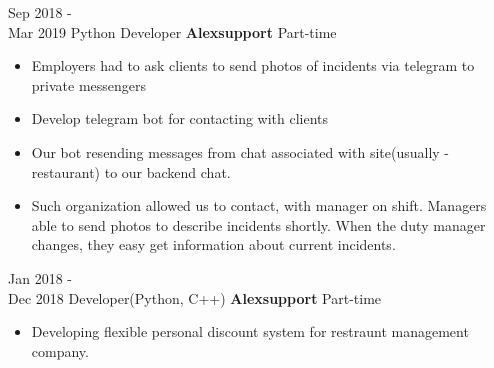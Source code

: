 \documentclass[a4paper]{twentysecondcv} %
\begin{document}
\begin{twenty}
{\begin{itemize}
            \end{itemize}
        }
    \twentyitem
        {Sep 2018 - \\ Mar 2019}
        {Python Developer}
        {\textbf{Alexsupport}}
        {Part-time}
        {
            \begin{itemize}
                \item Employers had to ask clients to send photos of incidents via telegram to private messengers
                \item Develop telegram bot for contacting with clients
                \item Our bot resending messages from chat associated with site(usually - restaurant) to
                our backend chat.
                \item Such organization allowed us to contact, with manager on shift. Managers able to send
                photos to describe incidents shortly. When the duty manager changes, they easy get information about
                current incidents.
            \end{itemize}
        }
    \twentyitem
        {Jan 2018 - \\ Dec 2018}
        {Developer(Python, C++) }
        {\textbf{Alexsupport}}
        {Part-time}
        {
            \begin{itemize}
                \item Developing flexible personal discount system for restraunt management company.
            \end{itemize}
        }
\end{twenty}

\pagebreak[4]
\makesidebar
\end{document}
